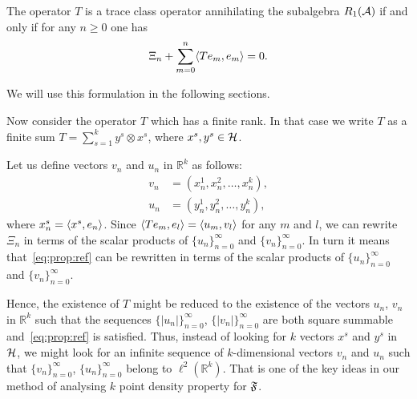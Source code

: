 \documentclass[12pt]{amsart}
\theoremstyle{case}
\begin{document}
  \begin{prop}
    \label{prop:reformulation}
    The operator $T$ is a trace class operator annihilating the subalgebra $R_1(\cal{A})$ if and only if
      for any $n \geq 0$ one has 
        \begin{equation}
          \label{eq:prop:ref}
          \Xi_n + \sum_{m=0}^n \inner{Te_m}{e_m} = 0.
        \end{equation}
  \end{prop}
    We will use this formulation in the following sections.

  \medskip
  Now consider the operator $T$ which has a finite rank.
  In that case we write $T$ as a finite sum $T = \sum_{s=1}^k y^s \otimes x^s$,
    where $x^s, y^s \in \cal{H}$.

  Let us define vectors $v_n$ and $u_n$ in $\mathbb{R}^k$ as follows:
  \begin{align*}
    v_n &= (x^1_n, x^2_n, \dots, x^k_n),\\
    u_n &= (y^1_n, y^2_n, \dots, y^k_n),
  \end{align*}
  where $x^s_n = \inner{x^s}{e_n}$.
  Since $\inner{Te_m}{e_l} = \inner{u_m}{v_l}$ for any $m$ and $l$, we can rewrite $\Xi_n$ in terms of
    the scalar products of $\{u_n\}_{n=0}^\infty$ and $\{v_n\}_{n=0}^\infty$.
  In turn it means that~\eqref{eq:prop:ref} can be rewritten in terms of the scalar products
    of $\{u_n\}_{n=0}^\infty$ and $\{v_n\}_{n=0}^\infty$.

  Hence, the existence of $T$ might be reduced to the existence of
    the vectors $u_n$, $v_n$ in $\mathbb{R}^k$ such that the sequences $\{\lvert u_n\rvert\}_{n=0}^\infty$,
    $\{\lvert v_n\rvert\}_{n=0}^\infty$ are both square summable and~\eqref{eq:prop:ref} is satisfied.
  Thus, instead of looking for $k$ vectors $x^s$ and $y^s$ in $\cal{H}$, we might look for an infinite sequence
    of $k$-dimensional vectors $v_n$ and $u_n$ such that $\{v_n \}_{n=0}^\infty$, $\{u_n\}_{n=0}^\infty$ belong to $\ell^2(\mathbb{R}^k)$.
  That is one of the key ideas in our method of analysing $k$ point density property for $\fsys$.
\end{document}
